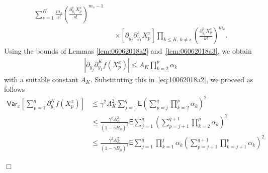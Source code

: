 \documentclass[bj]{imsart}
\newcommand{\proofendsign}{$\Box$}
\newenvironment{proof}{{\noindent \bf Proof }}
 {{\hspace*{\fill}\proofendsign\par\bigskip}}
\begin{document}
\begin{proof}
\begin{eqnarray*}
\sum_{s=1}^{K}\frac{m_{s}}{s!}
\left(\frac{\partial_{y_{1}}^{s}X^x_{p}}{s!}\right)^{m_{s}-1}
\\
&& \times\left[\partial_{y_{j}}\partial_{y_{1}}^{s}X^x_{p}\right]
\prod_{k\le K,\,k\neq s}\left(\frac{\partial_{y_{1}}^{k}X^x_{p}}{k!}\right)^{m_{k}}.
\end{eqnarray*}
Using the bounds of
Lemmas \ref{lem:06062018a2} and~\ref{lem:06062018a3},
we obtain
\begin{eqnarray}
\label{eq:part-part}
\left|\partial_{y_{j}}\partial_{y_{1}}^{K}f\left(X_{p}^x\right)\right|
\leq A_{K}\prod_{k=2}^{p}\alpha_{k}
\end{eqnarray}
with a suitable constant $A_{K}$.
Substituting this in~\eqref{eq:10062018a2},
we proceed as follows
\begin{align*}
\mathsf{Var}_x\left[\sum_{p=1}^{q}\partial_{y_{1}}^{K}f\left(X_{p}^x\right)\right]
&\le
\gamma^2 A_{K}^{2}\sum_{j=1}^{q}
\mathsf{E}\left(\sum_{p=j}^{q}\prod_{k=2}^{p}\alpha_{k}\right)^{2}
\\
&\le
\frac{\gamma^2 A_{K}^{2}}{(1-\gamma B_\mu)^2}
\mathsf{E}\sum_{j=1}^{q}
\left(\sum_{p=j+1}^{q+1}  \prod_{k=2}^{p} \alpha_{k}
\right)^{2}
\\
&\le
\frac{\gamma^2 A_{K}^{2}}{(1-\gamma B_\mu)^3}
\mathsf{E}\sum_{j=1}^{q}
\prod_{k=1}^{j} \alpha_{k}
\left(\sum_{p=j+1}^{q+1}  \prod_{k=j+1}^{p} \alpha_{k}
\right)^{2}
\end{align*}


\end{proof}
\end{document}
